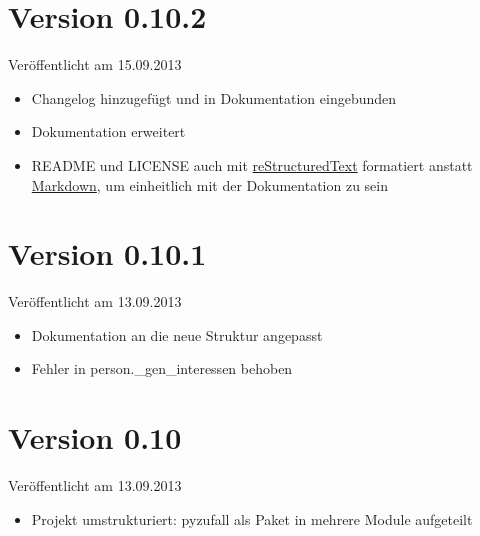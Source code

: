 \documentclass[a4paper,12pt,oneside]{sphinxmanual}
\begin{document}
\section{Version 0.10.2}
\label{changelog:version-0-10-2}
Veröffentlicht am 15.09.2013
\begin{itemize}
\item {} 
Changelog hinzugefügt und in Dokumentation eingebunden

\item {} 
Dokumentation erweitert

\item {} 
README und LICENSE auch mit \href{http://de.wikipedia.org/wiki/ReStructuredText}{reStructuredText} formatiert anstatt \href{http://de.wikipedia.org/wiki/Markdown}{Markdown}, um einheitlich mit der Dokumentation zu sein

\end{itemize}


\section{Version 0.10.1}
\label{changelog:version-0-10-1}
Veröffentlicht am 13.09.2013
\begin{itemize}
\item {} 
Dokumentation an die neue Struktur angepasst

\item {} 
Fehler in person.\_gen\_interessen behoben

\end{itemize}


\section{Version 0.10}
\label{changelog:version-0-10}
Veröffentlicht am 13.09.2013
\begin{itemize}
\item {} 
Projekt umstrukturiert: pyzufall als Paket in mehrere Module aufgeteilt

\end{itemize}
\end{document}
